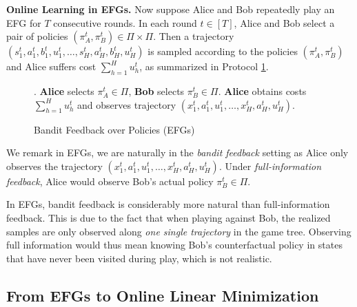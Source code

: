 \documentclass[11pt]{article}
\begin{document}
\textbf{Online Learning in EFGs.} Now suppose Alice and Bob repeatedly play an EFG for $T$ consecutive rounds. In each round $t \in [T]$, Alice and Bob select a pair of policies $(\pi_A^t,\pi_B^t) \in \Pi\times\Pi$. Then a trajectory $(s_1^t,a_1^t,b_1^t,u_1^t,\dots,s_H^t, a_H^t, b_H^t, u_H^t)$ is sampled according to the policies $(\pi_A^t,\pi_B^t)$ and Alice suffers cost $\sum_{h=1}^H u_h^t$, as summarized in Protocol \ref{prot:EFGs-bandit}. 

\begin{figure}[H]
\centering
\begin{minipage}{1.0\textwidth}
\begin{protocol}[H]
    \caption{Bandit Feedback over Policies (EFGs)}
    \label{prot:EFGs-bandit}
    \centering
    \begin{algorithmic}
        .
            \State \textbf{Alice} selects $\pi_A^{t}\in\Pi$, \textbf{Bob} selects $\pi_{B}^{t}\in\Pi$.
            \State \textbf{Alice} obtains costs $\sum_{h=1}^H u_h^t$ and observes trajectory $(x_1^t,a_1^t,u_1^t,\dots,x_H^t, a_H^t, u_H^t)$.
        \EndFor
    \end{algorithmic}
\end{protocol}
\end{minipage}
\end{figure}

We remark in EFGs, we are naturally in the \textit{bandit feedback} setting as Alice only observes the trajectory $(x_1^t,a_1^t,u_1^t,\dots,x_H^t, a_H^t, u_H^t)$. Under \textit{full-information feedback}, Alice would observe Bob's actual policy $\pi_B^t \in \Pi$. 
\begin{remark}
    In EFGs, bandit feedback is considerably more natural than full-information feedback. This is due to the fact that when playing against Bob, the realized samples are only observed along \emph{one single trajectory} in the game tree. Observing full information would thus mean knowing Bob's counterfactual policy in states that have never been visited during play, which is not realistic.
\end{remark}

\subsection{From EFGs to Online Linear Minimization} \label{sec:efg-reduction}
\end{document}
